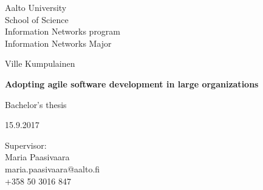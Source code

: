 \begin{titlepage}
    \begin{flushleft}
    \begin{minipage}{15cm}
        \linespread{1.0}\small
        Aalto University\\
        School of Science \\
        Information Networks program \\
        Information Networks Major
        \par
    \end{minipage}
    \end{flushleft}
    \centering
    \vspace{3cm}
    {\Large Ville Kumpulainen \par}
    {\LARGE\bfseries Adopting agile software development in large organizations\par}
    \vspace{5cm}
    \raggedright{}
    {\large Bachelor's thesis\par}
    {\large 15.9.2017}
    \vfill

    \begin{flushleft}
    \begin{minipage}{15cm}
        \linespread{1.0}\small
        Supervisor:\\
        Maria Paasivaara\\
        maria.paasivaara@aalto.fi \\
        +358 50 3016 847 \\
        \par
    \end{minipage}
    \end{flushleft}


\end{titlepage}
